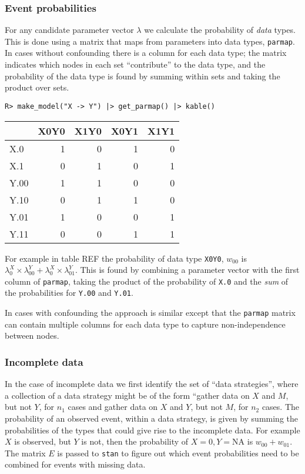 \documentclass[
  11pt,
  article]{jss}
\begin{document}
\hypertarget{event-probabilities}{%
\subsubsection{Event probabilities}\label{event-probabilities}}

For any candidate parameter vector \(\lambda\) we calculate the
probability of \emph{data} types. This is done using a matrix that maps
from parameters into data types, \texttt{parmap}. In cases without
confounding there is a column for each data type; the matrix indicates
which nodes in each set ``contribute'' to the data type, and the
probability of the data type is found by summing within sets and taking
the product over sets.

\begin{verbatim}
R> make_model("X -> Y") |> get_parmap() |> kable()
\end{verbatim}

\begin{tabular}{l|r|r|r|r}
\hline
  & X0Y0 & X1Y0 & X0Y1 & X1Y1\\
\hline
X.0 & 1 & 0 & 1 & 0\\
\hline
X.1 & 0 & 1 & 0 & 1\\
\hline
Y.00 & 1 & 1 & 0 & 0\\
\hline
Y.10 & 0 & 1 & 1 & 0\\
\hline
Y.01 & 1 & 0 & 0 & 1\\
\hline
Y.11 & 0 & 0 & 1 & 1\\
\hline
\end{tabular}

For example in table REF the probability of data type \texttt{X0Y0},
\(w_{00}\) is
\(\lambda^X_0\times \lambda^Y_{00} + \lambda^X_0\times \lambda^Y_{01}\).
This is found by combining a parameter vector with the first column of
\texttt{parmap}, taking the product of the probability of \texttt{X.0}
and the \emph{sum} of the probabilities for \texttt{Y.00} and
\texttt{Y.01}.

In cases with confounding the approach is similar except that the
\texttt{parmap} matrix can contain multiple columns for each data type
to capture non-independence between nodes.

\hypertarget{incomplete-data}{%
\subsubsection{Incomplete data}\label{incomplete-data}}

In the case of incomplete data we first identify the set of ``data
strategies'', where a collection of a data strategy might be of the form
``gather data on \(X\) and \(M\), but not \(Y\), for \(n_1\) cases and
gather data on \(X\) and \(Y\), but not \(M\), for \(n_2\) cases. The
probability of an observed event, within a data strategy, is given by
summing the probabilities of the types that could give rise to the
incomplete data. For example \(X\) is observed, but \(Y\) is not, then
the probability of \(X=0, Y = \text{NA}\) is \(w_{00} +w_{01}\). The
matrix \(E\) is passed to \texttt{stan} to figure out which event
probabilities need to be combined for events with missing data.
\end{document}
